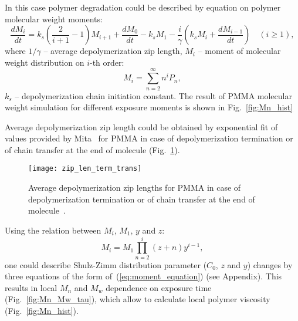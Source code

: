 \documentclass[12pt, letterpaper]{article}
\begin{document}
\noindent In this case polymer degradation could be described by equation on polymer molecular weight moments:
\begin{equation} \label{eq:moment_equation}
	\frac{d M_i}{d t}=k_s(\frac{2}{i+1}-1) M_{i+1}+\frac{d M_0}{d t}-k_s M_1 - \frac{i}{\gamma}(k_s M_i+\frac{d M_{i-1}}{d t}) \quad(i \geq 1),
\end{equation}
where $1/\gamma$ -- average depolymerization zip length, $M_i$ -- moment of molecular weight distribution on $i$-th order:
\begin{equation}
	M_i=\sum_{n=2}^{\infty} n^i P_n,
\end{equation}
$k_s$ -- depolymerization chain initiation constant. The result of PMMA molecular weight simulation for different exposure moments is shown in Fig.~\ref{fig:Mn_hist}

Average depolymerization zip length could be obtained by exponential fit of values provided by Mita~\cite{Mita_PMMA_zip_lengths_T} for PMMA in case of depolymerization termination or of chain transfer at the end of molecule (Fig.~\ref{fig:zip_lengths}).

\begin{figure}
	\begin{center}
		\texttt{[image: zip\_len\_term\_trans]}
	\end{center}
	\vspace{-2em}
	\caption{Average depolymerization zip lengths for PMMA in case of depolymerization termination or of chain transfer at the end of molecule~\cite{Mita_PMMA_zip_lengths_T}.}
	\label{fig:zip_lengths}
\end{figure}

\noindent Using the relation between $M_i$, $M_1$, $y$ and $z$:
\begin{equation}
	M_i=M_1 \prod_{n=2}^i(z+n) y^{i-1},
\end{equation}
one could describe Shulz-Zimm distribution parameter ($C_0$, $z$ and $y$) changes by three equations of the form of~(\ref{eq:moment_equation}) (see Appendix). This results in local $M_n$ and $M_w$ dependence on exposure time (Fig.~\ref{fig:Mn_Mw_tau}), which allow to calculate local polymer viscosity (Fig.~\ref{fig:Mn_hist}).
\end{document}
